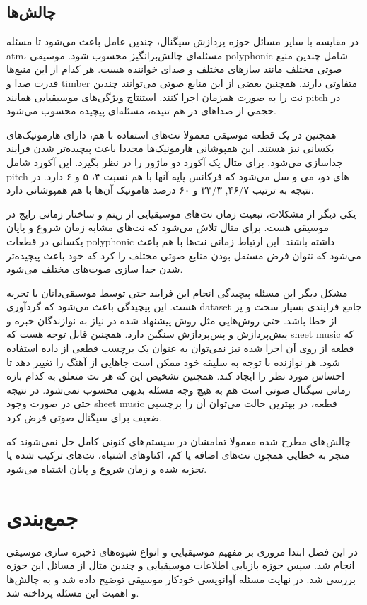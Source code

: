 \subsection{چالش‌ها}
در مقایسه با سایر مسائل حوزه پردازش سیگنال، چندین عامل باعث می‌شود تا مسئله
\gls{atm}، مسئله‌ای چالش‌برانگیز محسوب شود. موسیقی \gls{polyphonic} شامل چندین
منبع صوتی مختلف مانند ساز‌های مختلف و صدای خواننده هست. هر کدام از این منبع‌ها
قدرت صدا و \gls{timber} متفاوتی دارند. همچنین بعضی از این منابع صوتی می‌توانند
چندین نت را به صورت همزمان اجرا کنند. استنتاج ویژگی‌های موسیقیایی همانند
\gls{pitch} در حجمی از صداهای در هم تنیده، مسئله‌ای پیچیده محسوب می‌شود.

همچنین در یک قطعه موسیقی معمولا نت‌های استفاده با هم، دارای هارمونیک‌های یکسانی
نیز هستند. این همپوشانی هارمونیک‌ها مجددا باعث پیچیده‌تر شدن فرایند جداسازی
می‌شود. برای مثال یک آکورد دو ماژور را در نظر بگیرد. این آکورد شامل \gls{pitch}
های دو، می و سل می‌شود که فرکانس پایه آنها با هم نسبت ۴، ۵ و ۶ دارد. در نتیجه به
ترتیب ۴۶/۷, ۳۳/۳ و ۶۰ درصد هامونیک آن‌ها با هم همپوشانی دارد.

یکی دیگر از مشکلات، تبعیت زمان نت‌های موسیقیایی از ریتم و ساختار زمانی رایج در
موسیقی هست. برای مثال تلاش می‌شود که نت‌های مشابه زمان شروع و پایان یکسانی در
قطعات \gls{polyphonic} داشته باشند. این ارتباط زمانی نت‌ها با هم باعث می‌شود که
نتوان فرض مستقل بودن منابع صوتی مختلف را کرد که خود باعث پیچیده‌تر شدن جدا سازی
صوت‌های مختلف می‌شود.

مشکل دیگر این مسئله پیچیدگی انجام این فرایند حتی توسط موسیقی‌دانان با تجربه هست.
این پیچیدگی باعث می‌شود که گردآوری \gls{dataset} جامع فرایندی بسیار سخت و پر از
خطا باشد. حتی روش‌هایی مثل روش پیشنهاد شده در \cite{su2015escaping} نیاز به
نوازندگان خبره و پیش‌پردازش و پس‌پردازش سنگین دارد. همچنین قابل توجه هست که
\gls{sheet music} که قطعه از روی آن اجرا شده نیز نمی‌توان به عنوان یک برچسب قطعی
از داده استفاده شود. هر نوازنده با توجه به سلیقه خود ممکن است جاهایی از آهنگ را
تغییر دهد تا احساس مورد نظر را ایجاد کند. همچنین تشخیص این که هر نت متعلق به
کدام بازه زمانی سیگنال صوتی است هم به هیچ وجه مسئله‌ بدیهی محسوب نمی‌شود. در
نتیجه حتی در صورت وجود \gls{sheet music} قطعه، در بهترین حالت می‌توان آن را
برچسبی ضعیف برای سیگنال صوتی فرض کرد.

چالش‌های مطرح شده معمولا تمامشان در سیستم‌های کنونی کامل حل نمی‌شوند که منجر به
خطایی همچون نت‌های اضافه یا کم، اکتاوهای اشتباه، نت‌های ترکیب شده یا تجزیه شده و
زمان شروع و پایان اشتباه می‌شود.

\section{جمع‌بندی}
در این فصل ابتدا مروری بر مفهیم موسیقیایی و انواع شیوه‌های ذخیره سازی موسیقی
انجام شد. سپس حوزه بازیابی اطلاعات موسیقیایی و چندین مثال از مسائل این حوزه
بررسی شد. در نهایت مسئله آوانویسی خودکار موسیقی توضیح داده شد و به چالش‌ها و
اهمیت این مسئله پرداخته شد.